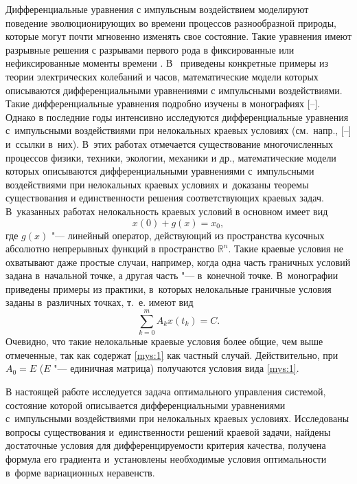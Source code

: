 Дифференциальные уравнения с импульсным воздействием моделируют поведение эволюционирующих во времени процессов разнообразной природы, которые могут почти мгновенно изменять свое состояние. 
Такие уравнения имеют разрывные решения с разрывами первого рода в фиксированные или нефиксированные моменты времени \cite{sha:bib:1}. 
В~\cite[стр. 10, 16]{sha:bib:2} приведены конкретные примеры из теории электрических колебаний и часов,   математические модели которых описываются  дифференциальными уравнениями с импульсными воздействиями. 
Такие дифференциальные уравнения  подробно изучены в монографиях [--]. 
Однако в последние годы интенсивно исследуются дифференциальные уравнения с~импульсными воздействиями при нелокальных краевых условиях (см.~напр., [--] и~ссылки в~них). 
В~этих работах отмечается существование многочисленных процессов физики, техники, экологии, механики и др.,  математические модели которых описываются дифференциальными уравнениями с~импульсными воздействиями при нелокальных краевых условиях и~доказаны теоремы существования и единственности решения соответствующих краевых задач. 
В~указанных работах нелокальность краевых условий в основном имеет  вид 
\begin{equation}
x(0)+g(x)=x_{0},
\label{mys:1}
\end{equation}
где $g(x)$ "--- линейный оператор, действующий из пространства  %
кусочных абсолютно непрерывных функций в пространство $\mathbb R^{n}$.  
Такие краевые условия  не охватывают даже простые случаи, например, когда одна часть граничных условий задана в~начальной  точке, а другая часть "--- в~конечной точке. 
В~монографии \cite{sha:bib:9} приведены примеры из практики, в~которых нелокальные граничные условия заданы в~различных точках, т.~е. имеют вид 
$$\sum_{k=0}^{m}A_{k} x(t_k)=C.$$ 
Очевидно, что такие нелокальные краевые условия более общие, чем выше отмеченные, так как содержат \eqref{mys:1} как частный случай. 
Действительно, при $A_{0}=E$ ($E$ "--- единичная матрица) получаются условия вида \eqref{mys:1}.

В настоящей работе исследуется задача оптимального управления системой, состояние которой описывается дифференциальными уравнениями с~импульсными воздействиями при нелокальных краевых условиях.
Исследованы вопросы существования и~единственности решений краевой задачи, найдены достаточные условия для дифференцируемости критерия качества, получена формула его градиента и~установлены необходимые условия оптимальности в~форме вариационных неравенств. 

